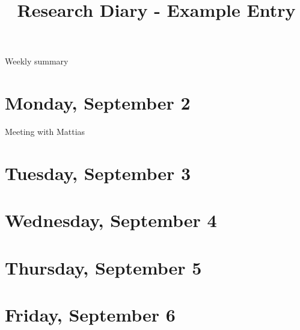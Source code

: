 \documentclass[11pt,letterpaper]{article}
\begin{document}
\univlogo

\title{Research Diary - Example Entry}

{\Huge Weekly summary}\\[5mm]

\section*{Monday, September 2}
Meeting with Mattias


\section*{Tuesday, September 3}

\section*{Wednesday, September 4}

\section*{Thursday, September 5}

\section*{Friday, September 6}

\printbibliography
\end{document}
